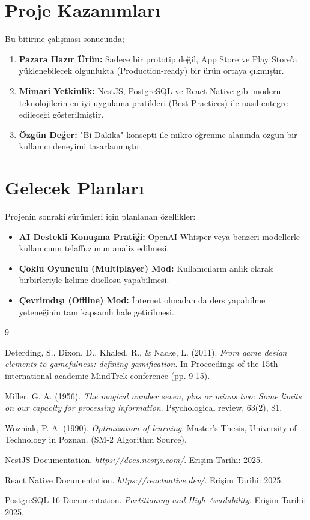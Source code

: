 \documentclass[12pt,a4paper]{report}
\begin{document}
\section{Proje Kazanımları}
Bu bitirme çalışması sonucunda;
\begin{enumerate}
    \item \textbf{Pazara Hazır Ürün:} Sadece bir prototip değil, App Store ve Play Store'a yüklenebilecek olgunlukta (Production-ready) bir ürün ortaya çıkmıştır.
    \item \textbf{Mimari Yetkinlik:} NestJS, PostgreSQL ve React Native gibi modern teknolojilerin en iyi uygulama pratikleri (Best Practices) ile nasıl entegre edileceği gösterilmiştir.
    \item \textbf{Özgün Değer:} "Bi Dakika" konsepti ile mikro-öğrenme alanında özgün bir kullanıcı deneyimi tasarlanmıştır.
\end{enumerate}

\section{Gelecek Planları}
Projenin sonraki sürümleri için planlanan özellikler:
\begin{itemize}
    \item \textbf{AI Destekli Konuşma Pratiği:} OpenAI Whisper veya benzeri modellerle kullanıcının telaffuzunun analiz edilmesi.
    \item \textbf{Çoklu Oyunculu (Multiplayer) Mod:} Kullanıcıların anlık olarak birbirleriyle kelime düellosu yapabilmesi.
    \item \textbf{Çevrimdışı (Offline) Mod:} İnternet olmadan da ders yapabilme yeteneğinin tam kapsamlı hale getirilmesi.
\end{itemize}

\begin{thebibliography}{9}

Deterding, S., Dixon, D., Khaled, R., \& Nacke, L. (2011). 
\textit{From game design elements to gamefulness: defining gamification}. 
In Proceedings of the 15th international academic MindTrek conference (pp. 9-15).

Miller, G. A. (1956). 
\textit{The magical number seven, plus or minus two: Some limits on our capacity for processing information}. 
Psychological review, 63(2), 81.

Wozniak, P. A. (1990). 
\textit{Optimization of learning}. 
Master's Thesis, University of Technology in Poznan. (SM-2 Algorithm Source).

NestJS Documentation. 
\textit{https://docs.nestjs.com/}. 
Erişim Tarihi: 2025.

React Native Documentation. 
\textit{https://reactnative.dev/}. 
Erişim Tarihi: 2025.

PostgreSQL 16 Documentation. 
\textit{Partitioning and High Availability}. 
Erişim Tarihi: 2025.

\end{thebibliography}
\end{document}
